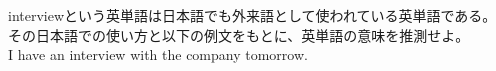 \documentclass{jarticle}
\begin{document}
\vspace*{\fill}
\begin{center}
interviewという英単語は日本語でも外来語として使われている英単語である。\\
その日本語での使い方と以下の例文をもとに、英単語の意味を推測せよ。\\
I have an interview with the company tomorrow.
\end{center}
\vspace*{\fill}
\end{document}
